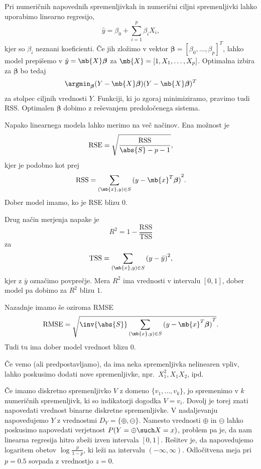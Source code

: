 
Pri numeričnih napovednih spremenljivkah in numerični ciljni spremenljivki lahko
uporabimo linearno regresijo,
\[
  \hat{y} = \beta_0 + \sum_{i = 1}^p \beta_i X_i,
\]
kjer so $\beta_i$ neznani koeficienti.
Če jih zložimo v vektor $\boldsymbol{\beta} = [\beta_0, \ldots, \beta_p]^T$,
lahko model prepišemo v $\hat{y} = \mb{X} \boldsymbol{\beta}$ za $\mb{X} = [1,
X_1, \ldots, X_p]$.
Optimalna izbira za $\boldsymbol{\beta}$ bo tedaj
\[
  \argmin_{\boldsymbol{\beta}} (Y - \mb{X} \boldsymbol{\beta}) (Y - \mb{X}
  \boldsymbol{\beta})^T
\]
za stolpec ciljnih vrednosti $Y$.
Funkciji, ki jo zgoraj minimiziramo, pravimo tudi RSS\@.
Optimalen $\boldsymbol{\beta}$ dobimo z reševanjem predoločenega sistema.


Napako linearnega modela lahko merimo na več načinov.
Ena možnost je 
\[
  \text{RSE} = \sqrt{\frac{\text{RSS}}{\abs{S} - p - 1}},
\]
kjer je podobno kot prej
\[
  \text{RSS} = \sum_{(\mb{x}, y) \in S} {(y - \mb{x}^T \boldsymbol{\beta})}^2.
\]
Dober model imamo, ko je RSE blizu $0$.

Drug način merjenja napake je 
\[
  R^2 = 1 - \frac{\text{RSS}}{\text{TSS}}
\]
za
\[
  \text{TSS} = \sum_{(\mb{x}, y) \in S} {(y - \bar{y})}^2,
\]
kjer z $\bar{y}$ označimo povprečje.
Mera $R^2$ ima vrednosti v intervalu $[0,1]$, dober model pa dobimo za $R^2$
blizu $1$.

Nazadnje imamo še  oziroma RMSE
\[
  \text{RMSE} = \sqrt{\inv{\abs{S}} \sum_{(\mb{x}, y) \in S} {(y - \mb{x}^T
	  \boldsymbol{\beta})}^T}.
\]
Tudi tu ima dober model vrednost blizu $0$.


Če vemo (ali predpostavljamo), da ima neka spremenljivka nelinearen vpliv, lahko
poskusimo dodati nove spremenljivke, npr.~$X_1^2, X_1 X_2$, ipd.


Če imamo diskretno spremenljivko $V$ z domeno $\{v_1, \ldots, v_k\}$, jo
spremenimo v $k$ numeričnih spremenljivk, ki so indikatorji dogodka $V = v_i$.
Dovolj je torej znati napovedati vrednost binarne diskretne spremenljivke.
V nadaljevanju napovedujemo $Y$ z vrednostmi $D_Y = \{\oplus, \ominus\}$.
Namesto vrednosti $\oplus$ in $\ominus$ lahko poskusimo napovedati verjetnost
$P(Y = \oplus \such X = x)$, problem pa je, da nam linearna regresija hitro
zbeži izven intervala $[0,1]$.
Rešitev je, da napovedujemo logaritem obetov $\log \frac{p}{1 - p}$, ki leži na
intervalu $(-\infty, \infty)$.
Odločitvena meja pri $p = 0.5$ sovpada z vrednostjo $z = 0$.

